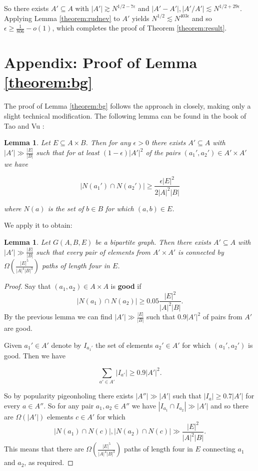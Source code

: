 \documentclass[12pt]{article}
\newtheorem{lemma}[theorem]{Lemma}
\begin{document}
So there exists $A' \subseteq A$ with $|A'|\gtrsim N^{1/2-7 \epsilon}$ and $|A'-A'|,|A'/A'|\lesssim N^{1/2+29\epsilon}$. Applying Lemma \ref{theorem:rudnev} to $A'$ yields $N^{1/2}\lesssim N^{403 \epsilon}$ and so $\epsilon \geq \frac{1}{806}-o(1)$, which completes the proof of Theorem \ref{theorem:result}.

\section*{Appendix: Proof of Lemma \ref{theorem:bg}}

The proof of Lemma \ref{theorem:bg} follows the approach in \cite{bg} closely, making only a slight technical modification. The following lemma can be found in the book of Tao and Vu \cite{TV}:

\begin{lemma}
Let $E \subseteq A \times B$. Then for any $\epsilon >0$ there exists $A' \subseteq A$ with $|A'|\gg \frac{|E|}{|B|} $ such that for at least $(1-\epsilon)|A'|^2$ of the pairs $(a_1',a_2') \in A'\times A'$ we have 

$$\left|N(a_1')\cap N(a_2')\right|\geq \frac{\epsilon |E|^2}{2|A|^2|B|}$$

where $N(a)$ is the set of $b\in B$ for which $(a,b) \in E$.
\end{lemma} 

We apply it to obtain:

\begin{lemma}
Let $G(A,B,E)$ be a bipartite graph. Then there exists $A'\subseteq A$ with $|A'|\gg \frac{|E|}{|B|}$ such that every pair of elements from $A' \times A'$ is connected by $\Omega\left(\frac{|E|^5}{|A|^4|B|^3}\right)$ paths of length four in $E$.
\end{lemma}

\begin{proof}
Say that $(a_1,a_2)\in A \times A$ is \textbf{good} if
$$\left|N(a_1)\cap N(a_2)\right|\geq 0.05 \frac{|E|^2}{|A|^2|B|}.$$ 
By the previous lemma we can find $|A'|\gg \frac{|E|}{|B|}$ such that $0.9 |A'|^2$ of pairs from $A'$ are good.

Given $a_1'\in A'$ denote by $I_{a_1'}$ the set of elements $a_2' \in A'$ for which $(a_1',a_2')$ is good. Then we have

$$\sum_{a' \in A'}|I_{a'}|\geq 0.9 |A'|^2.$$

So by popularity pigeonholing there exists $|A''|\gg|A'|$ such that $|I_a|\geq 0.7|A'| $ for every $a \in A''$. So for any pair $a_1,a_2 \in A''$ we have $|I_{a_1}\cap I_{a_2}|\gg |A'|$ and so there are $\Omega(|A'|)$ elements $c \in A'$ for which
$$|N(a_1)\cap N(c)|,|N(a_2)\cap N(c)|\gg \frac{|E|^2}{|A|^2|B|}.$$ This means that there are $\Omega \left(\frac{|E|^5}{|A|^4|B|^3}\right)$ paths of length four in $E$ connecting $a_1$ and $a_2$, as required. 
\end{proof}
\end{document}
